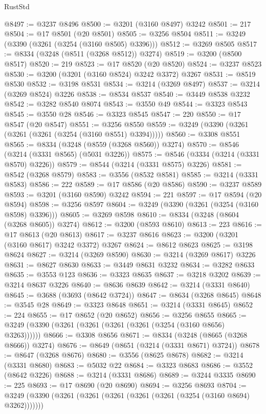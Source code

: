 \begin{lexlean}{RustStd}
\begin{coremodule}
@8497 := @3237 @8496
@8500 := @3201 (@3160 @8497) @3242
@8501 := 217
@8504 := @17 @8501 (@20 @8501)
@8505 := @3256 @8504
@8511 := @3249 (@3390 (@3261 (@3254 (@3160 @8505) @3396)))
@8512 := @3269 @8505
@8517 := @8334 (@3248 (@8511 (@3268 @8512)) @3274)
@8519 := @3200 (@8500 @8517)
@8520 := 219
@8523 := @17 @8520 (@20 @8520)
@8524 := @3237 @8523
@8530 := @3200 (@3201 (@3160 @8524) @3242 @3372) @3267
@8531 := @8519 @8530
@8532 := @3198 @8531
@8534 := @3214 (@3269 @8497)
@8537 := @3214 (@3269 @8524) @3226
@8538 := @8534 @8537
@8540 := @3449 @8538 @3232
@8542 := @3282 @8540 @8074
@8543 := @3550 @49
@8544 := @3323 @8543
@8545 := @3550 @28
@8546 := @3323 @8545
@8547 := 220
@8550 := @17 @8547 (@20 @8547)
@8551 := @3256 @8550
@8559 := @3249 (@3390 (@3261 (@3261 (@3261 (@3254 (@3160 @8551) @3394)))))
@8560 := @3308 @8551
@8565 := @8334 (@3248 (@8559 (@3268 @8560)) @3274)
@8570 := @8546 (@3214 (@3331 @8565) (@5031 @3226))
@8575 := @8546 (@3334 (@3214 (@3331 @8570) @3226))
@8579 := @8544 (@3214 (@3331 @8575) @3226)
@8581 := @8542 (@3268 @8579)
@8583 := @3556 (@8532 @8581)
@8585 := @3214 (@3331 @8583)
@8586 := 222
@8589 := @17 @8586 (@20 @8586)
@8590 := @3237 @8589
@8593 := @3201 (@3160 @8590) @3242
@8594 := 221
@8597 := @17 @8594 (@20 @8594)
@8598 := @3256 @8597
@8604 := @3249 (@3390 (@3261 (@3254 (@3160 @8598) @3396)))
@8605 := @3269 @8598
@8610 := @8334 (@3248 (@8604 (@3268 @8605)) @3274)
@8612 := @3200 (@8593 @8610)
@8613 := 223
@8616 := @17 @8613 (@20 @8613)
@8617 := @3237 @8616
@8623 := @3200 (@3201 (@3160 @8617) @3242 @3372) @3267
@8624 := @8612 @8623
@8625 := @3198 @8624
@8627 := @3214 (@3269 @8590)
@8630 := @3214 (@3269 @8617) @3226
@8631 := @8627 @8630
@8633 := @3449 @8631 @3232
@8634 := @3282 @8633
@8635 := @3553 @123
@8636 := @3323 @8635
@8637 := @3218 @3202
@8639 := @3214 @8637 @3226
@8640 := @8636 @8639
@8642 := @3214 (@3331 @8640)
@8645 := @3688 (@3693 (@8642 @3724))
@8647 := @8634 (@3268 @8645)
@8648 := @3545 @28
@8649 := @3323 @8648
@8651 := @3214 (@3331 @8645)
@8652 := 224
@8655 := @17 @8652 (@20 @8652)
@8656 := @3256 @8655
@8665 := @3249 (@3390 (@3261 (@3261 (@3261 (@3261 (@3254 (@3160 @8656) @3263))))))
@8666 := @3308 @8656
@8671 := @8334 (@3248 (@8665 (@3268 @8666)) @3274)
@8676 := @8649 (@8651 (@3214 (@3331 @8671) @3724))
@8678 := @8647 (@3268 @8676)
@8680 := @3556 (@8625 @8678)
@8682 := @3214 (@3331 @8680)
@8683 := @5032 @22
@8684 := @3323 @8683
@8686 := @3552 (@8642 @3226)
@8688 := @3214 (@3331 @8686)
@8689 := @3244 @3335
@8690 := 225
@8693 := @17 @8690 (@20 @8690)
@8694 := @3256 @8693
@8704 := @3249 (@3390 (@3261 (@3261 (@3261 (@3261 (@3261 (@3254 (@3160 @8694) @3262)))))))

\end{coremodule}
\end{lexlean}
